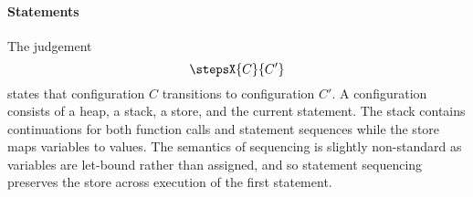 
\paragraph{Statements}
The judgement
\[
\stepsX{C}{C'}
\]
states that configuration $C$ transitions to configuration $C'$.  A
configuration consists of a heap, a stack, a store, and the current
statement. The stack contains continuations for both function calls
and statement sequences while the store maps variables to values. The
semantics of sequencing is slightly non-standard as variables are
let-bound rather than assigned, and so statement sequencing preserves
the store across execution of the first statement.

